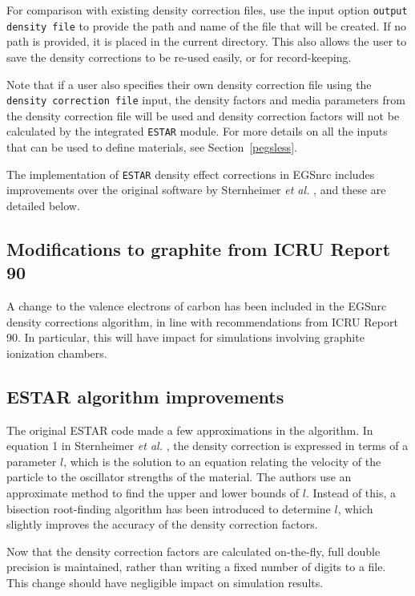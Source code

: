For comparison with existing density correction files, use the input option {\tt output density file} to provide the path and name of the file that will be created. If no path is provided, it is placed in the current directory. This also allows the user to save the density corrections to be re-used easily, or for record-keeping.

Note that if a user also specifies their own density correction file using the {\tt density correction file} input, the density factors and media parameters from the density correction file will be used and density correction factors will not be calculated by the integrated {\tt ESTAR} module. For more details on all the inputs that can be used to define materials, see Section~\ref{pegsless}.

The implementation of {\tt ESTAR} density effect corrections in EGSnrc includes improvements over the original software by Sternheimer {\em et al.} \cite{St82}, and these are detailed below.

\subsection{Modifications to graphite from ICRU Report 90}
A change to the valence electrons of carbon has been included in the EGSnrc density corrections algorithm, in line with recommendations from ICRU Report 90. In particular, this will have impact for simulations involving graphite ionization chambers.

\subsection{ESTAR algorithm improvements}
The original ESTAR code made a few approximations in the algorithm. In equation 1 in Sternheimer {\em et al.} \cite{St82}, the density correction is expressed in terms of a parameter $l$, which is the solution to an equation relating the velocity of the particle to the oscillator strengths of the material. The authors use an approximate method to find the upper and lower bounds of $l$. Instead of this, a bisection root-finding algorithm has been introduced to determine $l$, which slightly improves the accuracy of the density correction factors.

Now that the density correction factors are calculated on-the-fly, full double precision is maintained, rather than writing a fixed number of digits to a file. This change should have negligible impact on simulation results.

